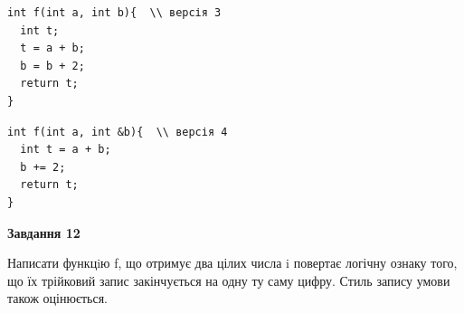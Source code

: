 \documentclass[12pt, ukrainian]{article}
\begin{document}
{\begin {large}
\begin{minipage}[t]{11.0cm}
\vspace{-8mm}\begin{verbatim}
int f(int a, int b){  \\ версія 3
  int t;
  t = a + b;
  b = b + 2;
  return t;
}
\end{verbatim}

\vspace{-8mm}\begin{verbatim}
int f(int a, int &b){  \\ версія 4
  int t = a + b;
  b += 2;
  return t;
}
\end{verbatim}



\begin{center}
\textbf{Завдання 12}
\end{center}

Написати функцiю f, що отримує два цілих числа i повертає логічну ознаку того, що їх трійковий запис закінчується на одну ту саму цифру. Стиль запису умови також оцінюється.\par

\end{minipage}

\end {large}}
\newpage
\end{document}
